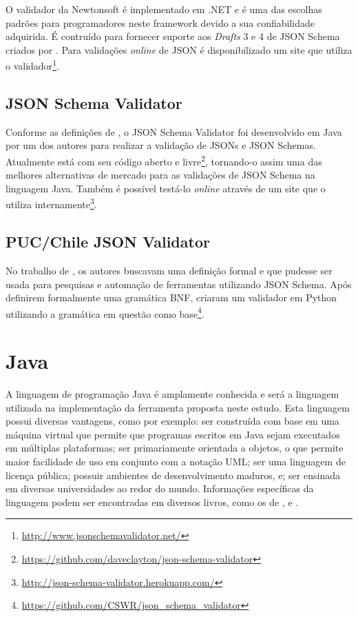 O validador da Newtonsoft é implementado em .NET \cite{NEWTONSOFT} e é uma das escolhas padrões para programadores neste framework devido a sua confiabilidade adquirida. É contruído para fornecer suporte aos \textit{Drafts} 3 e 4 de JSON Schema criados por . Para validações \textit{online} de JSON é disponibilizado um site que utiliza o validador\footnote{\url{http://www.jsonschemavalidator.net/}}.

\subsection{JSON Schema Validator}

Conforme as definições de , o JSON Schema Validator foi desenvolvido em Java por um dos autores para realizar a validação de JSONs e JSON Schemas. Atualmente está com seu código aberto e livre\footnote{\url{https://github.com/daveclayton/json-schema-validator}}, tornando-o assim uma das melhores alternativas de mercado para as validações de JSON Schema na linguagem Java. Também é possível testá-lo \textit{online} através de um site que o utiliza internamente\footnote{\url{http://json-schema-validator.herokuapp.com/}}.


\subsection{PUC/Chile JSON Validator}

No trabalho de , os autores buscavam uma definição formal e que pudesse ser usada para pesquisas e automação de ferramentas utilizando JSON Schema. Após definirem formalmente uma gramática BNF, criaram um validador em Python utilizando a gramática em questão como base\footnote{\url{https://github.com/CSWR/json_schema_validator}}.


\section{Java}

A linguagem de programação Java é amplamente conhecida e será a linguagem utilizada na implementação da ferramenta proposta neste estudo. Esta linguagem possui diversas vantagens, como por exemplo: ser construída com base em uma máquina virtual que permite que programas escritos em Java sejam executados em múltiplas plataformas; ser primariamente orientada a objetos, o que permite maior facilidade de uso em conjunto com a notação UML; ser uma linguagem de licença pública; possuir ambientes de desenvolvimento maduros, e; ser ensinada em diversas universidades ao redor do mundo. Informações específicas da linguagem podem ser encontradas em diversos livros, como os de ,  e .


